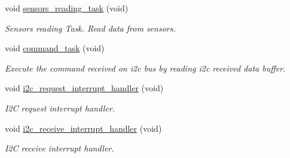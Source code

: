 \begin{DoxyCompactItemize}
void \hyperlink{i2c-th_8h_af0e8965583b124096972fe3a9e0e7954}{sensors\+\_\+reading\+\_\+task} (void)
\begin{DoxyCompactList}\small\item\em Sensors reading Task. Read data from sensors. \end{DoxyCompactList}\item 
void \hyperlink{i2c-th_8h_a9f32a4169471a435e9364460d7b1761d}{command\+\_\+task} (void)
\begin{DoxyCompactList}\small\item\em Execute the command received on i2c bus by reading i2c received data buffer. \end{DoxyCompactList}\item 
void \hyperlink{i2c-th_8h_ac1da31566bf05976ecb87372278a1ea8}{i2c\+\_\+request\+\_\+interrupt\+\_\+handler} (void)
\begin{DoxyCompactList}\small\item\em I2C request interrupt handler. \end{DoxyCompactList}\item 
void \hyperlink{i2c-th_8h_a7f81fcf39717baf18f2e7c2eee2051ae}{i2c\+\_\+receive\+\_\+interrupt\+\_\+handler} (void)
\begin{DoxyCompactList}\small\item\em I2C receive interrupt handler. \end{DoxyCompactList}\end{DoxyCompactItemize}
